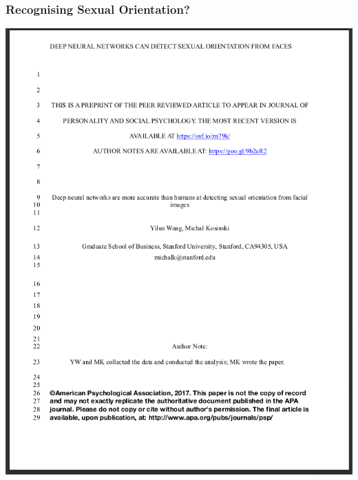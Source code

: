 \documentclass[aspectratio=169,x11names]{beamer}
\begin{document}
\begin{frame}
\frametitle{Recognising Sexual Orientation?}
\begin{minipage}{.6\textwidth}
\begin{center}
\includegraphics[height=0.75\textheight, keepaspectratio]{images/paper_orientation}
\end{center}
\end{minipage}\hspace*{-25pt}\begin{minipage}{.4\textwidth}
\begin{center}

\end{center}
\end{minipage}
\end{frame}
\end{document}
